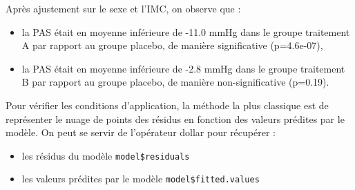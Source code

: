 \documentclass[
]{book}
\newenvironment{Shaded}{\begin{snugshade}}{\end{snugshade}}
\newcommand{\AttributeTok}[1]{\textcolor[rgb]{0.13,0.29,0.53}{#1}}
\newcommand{\CommentTok}[1]{\textcolor[rgb]{0.56,0.35,0.01}{\textit{#1}}}
\newcommand{\DecValTok}[1]{\textcolor[rgb]{0.00,0.00,0.81}{#1}}
\newcommand{\FloatTok}[1]{\textcolor[rgb]{0.00,0.00,0.81}{#1}}
\newcommand{\FunctionTok}[1]{\textcolor[rgb]{0.13,0.29,0.53}{\textbf{#1}}}
\newcommand{\NormalTok}[1]{#1}
\newcommand{\SpecialCharTok}[1]{\textcolor[rgb]{0.81,0.36,0.00}{\textbf{#1}}}
\newcommand{\StringTok}[1]{\textcolor[rgb]{0.31,0.60,0.02}{#1}}
\providecommand{\tightlist}{%
  \setlength{\itemsep}{0pt}\setlength{\parskip}{0pt}}
\begin{document}
Après ajustement sur le sexe et l'IMC, on observe que :

\begin{itemize}
\tightlist
\item
  la PAS était en moyenne inférieure de -11.0 mmHg dans le groupe traitement A par rapport au groupe placebo, de manière significative (p=4.6e-07),
\item
  la PAS était en moyenne inférieure de -2.8 mmHg dans le groupe traitement B par rapport au groupe placebo, de manière non-significative (p=0.19).
\end{itemize}

Pour vérifier les conditions d'application, la méthode la plus classique est de représenter le nuage de points des résidus en fonction des valeurs prédites par le modèle. On peut se servir de l'opérateur dollar pour récupérer :

\begin{itemize}
\tightlist
\item
  les résidus du modèle \texttt{model\$residuals}
\item
  les valeurs prédites par le modèle \texttt{model\$fitted.values}
\end{itemize}

\begin{Shaded}
\end{Shaded}
\end{document}
